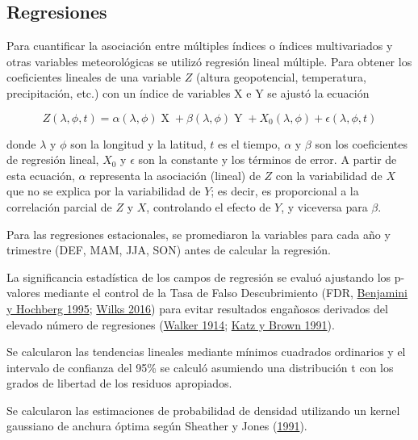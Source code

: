 \documentclass[12pt,oneside,a4paper]{reedthesis}
\begin{document}
\hypertarget{regresiones}{%
\subsection{Regresiones}\label{regresiones}}

Para cuantificar la asociación entre múltiples índices o índices multivariados y otras variables meteorológicas se utilizó regresión lineal múltiple.
Para obtener los coeficientes lineales de una variable \(Z\) (altura geopotencial, temperatura, precipitación, etc.) con un índice de variables X e Y se ajustó la ecuación

\begin{equation}
Z(\lambda, \phi, t) = \alpha(\lambda, \phi) \operatorname{X} + \beta(\lambda, \phi) \operatorname{Y} + X_0(\lambda, \phi) + \epsilon(\lambda, \phi, t)
\label{eq:multiple-regression-sam}
\end{equation}

donde \(\lambda\) y \(\phi\) son la longitud y la latitud, \(t\) es el tiempo, \(\alpha\) y \(\beta\) son los coeficientes de regresión lineal, \(X_0\) y \(\epsilon\) son la constante y los términos de error.
A partir de esta ecuación, \(\alpha\) representa la asociación (lineal) de \(Z\) con la variabilidad de \(X\) que no se explica por la variabilidad de \(Y\); es decir, es proporcional a la correlación parcial de \(Z\) y \(X\), controlando el efecto de \(Y\), y viceversa para \(\beta\).

Para las regresiones estacionales, se promediaron la variables para cada año y trimestre (DEF, MAM, JJA, SON) antes de calcular la regresión.

La significancia estadística de los campos de regresión se evaluó ajustando los p-valores mediante el control de la Tasa de Falso Descubrimiento (FDR, \protect\hyperlink{ref-benjamini1995}{Benjamini y Hochberg 1995}; \protect\hyperlink{ref-wilks2016}{Wilks 2016}) para evitar resultados engañosos derivados del elevado número de regresiones (\protect\hyperlink{ref-walker1914}{Walker 1914}; \protect\hyperlink{ref-katz1991}{Katz y Brown 1991}).

Se calcularon las tendencias lineales mediante mínimos cuadrados ordinarios y el intervalo de confianza del 95\% se calculó asumiendo una distribución t con los grados de libertad de los residuos apropiados.

Se calcularon las estimaciones de probabilidad de densidad utilizando un kernel gaussiano de anchura óptima según Sheather y Jones (\protect\hyperlink{ref-sheather1991}{1991}).
\end{document}
